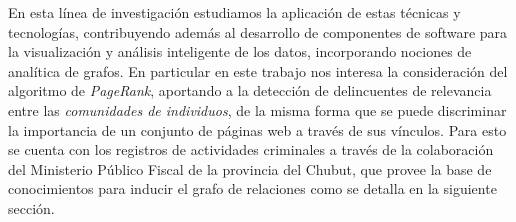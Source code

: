En esta línea de investigación estudiamos la aplicación de estas técnicas y tecnologías, contribuyendo además al desarrollo de componentes de software para la visualización y análisis inteligente de los datos, incorporando nociones de analítica de grafos. 
En particular en este trabajo nos interesa la consideración del algoritmo de \textit{PageRank}, aportando a la detección de delincuentes de relevancia entre las \textit{comunidades de individuos}, de la misma forma que se puede discriminar la importancia de un conjunto de páginas web a través de sus vínculos. 
Para esto se cuenta con los registros de actividades criminales a través de la colaboración del Ministerio Público Fiscal de la provincia del Chubut, que provee la base de conocimientos para inducir el grafo de relaciones como se detalla en la siguiente sección.
